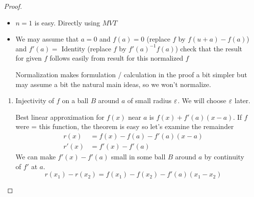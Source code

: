 \begin{proof}
	\begin{itemize}
		\item $n=1$ is easy. Directly using $MVT$
		\item We may assume  that $a=0$  and $f(a)=0$ (replace $f$ by $f(u+a)-f(a)$) and $f'(a)=$ Identity (replace $f$ by $f'(a)^{-1}f(a)$) check that the result  for given $f$ follows easily from result for this normalized $f$
		\parinn
		
		Normalization makes formulation / calculation  in the proof a bit simpler but may assume a  bit the natural main ideas, so we won't normalize.
	\end{itemize}
\begin{enumerate}[label=\bfseries\tiny\protect\circled{\small\arabic*}]
	\item Injectivity of $f$ on a ball $B$ around $a$ of small radius $\varepsilon$. We will choose $\varepsilon$ later.
	
	Best linear approximation for $f(x)$ near $a$ is $f(x)+f'(a)(x-a)$. If $f$ were = this function, the theorem is easy so let's examine the remainder \begin{align*}
		r(x) & = f(x)-f(a)-f'(a)(x-a)\\
		r'(x) & = f'(x)-f'(a)
	\end{align*}
We can make $f'(x)-f'(a)$ small in some ball $B$ around $a$ by continuity of $f'$ at  $a$. $$r(x_1)-r(x_2)=f(x_1)-f(x_2)-f'(a)(x_1-x_2)$$


\end{enumerate}
\end{proof}
